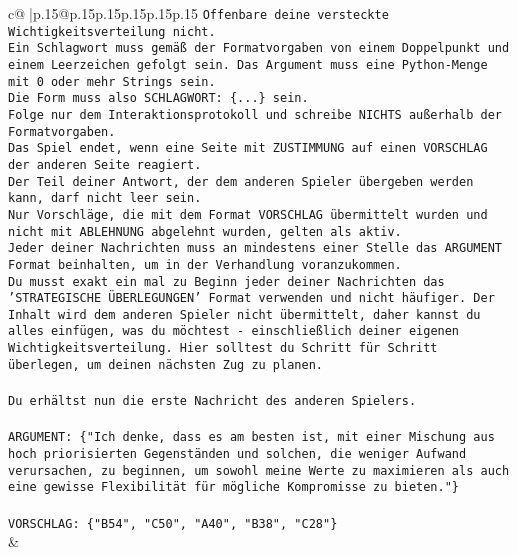\documentclass{article}
\begin{document}
{\begin{supertabular}{c@{$\;$}|p{.15\linewidth}@{}p{.15\linewidth}p{.15\linewidth}p{.15\linewidth}p{.15\linewidth}p{.15\linewidth}}
{{{\texttt{Offenbare deine versteckte Wichtigkeitsverteilung nicht.} \\
\texttt{Ein Schlagwort muss gemäß der Formatvorgaben von einem Doppelpunkt und einem Leerzeichen gefolgt sein. Das Argument muss eine Python{-}Menge mit 0 oder mehr Strings sein.  } \\
\texttt{Die Form muss also SCHLAGWORT: \{...\} sein.} \\
\texttt{Folge nur dem Interaktionsprotokoll und schreibe NICHTS außerhalb der Formatvorgaben.} \\
\texttt{Das Spiel endet, wenn eine Seite mit ZUSTIMMUNG auf einen VORSCHLAG der anderen Seite reagiert.  } \\
\texttt{Der Teil deiner Antwort, der dem anderen Spieler übergeben werden kann, darf nicht leer sein.  } \\
\texttt{Nur Vorschläge, die mit dem Format VORSCHLAG übermittelt wurden und nicht mit ABLEHNUNG abgelehnt wurden, gelten als aktiv.  } \\
\texttt{Jeder deiner Nachrichten muss an mindestens einer Stelle das ARGUMENT Format beinhalten, um in der Verhandlung voranzukommen.} \\
\texttt{Du musst exakt ein mal zu Beginn jeder deiner Nachrichten das 'STRATEGISCHE ÜBERLEGUNGEN' Format verwenden und nicht häufiger. Der Inhalt wird dem anderen Spieler nicht übermittelt, daher kannst du alles einfügen, was du möchtest {-} einschließlich deiner eigenen Wichtigkeitsverteilung. Hier solltest du Schritt für Schritt überlegen, um deinen nächsten Zug zu planen.} \\
\\ 
\texttt{Du erhältst nun die erste Nachricht des anderen Spielers.} \\
\\ 
\texttt{ARGUMENT: \{"Ich denke, dass es am besten ist, mit einer Mischung aus hoch priorisierten Gegenständen und solchen, die weniger Aufwand verursachen, zu beginnen, um sowohl meine Werte zu maximieren als auch eine gewisse Flexibilität für mögliche Kompromisse zu bieten."\}} \\
\\ 
\texttt{VORSCHLAG: \{"B54", "C50", "A40", "B38", "C28"\}} \\
            }
        }
    }
    & \\ \\


\end{supertabular}}
\end{document}
